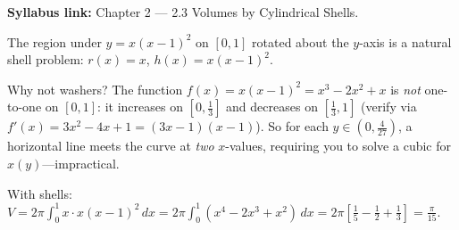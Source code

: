 \begin{extension}[title={Extension (Tutorial 4, Q5: Why shells are awkward for $y=x(x-1)^2$)}]
\textbf{Syllabus link:} Chapter 2 — 2.3 Volumes by Cylindrical Shells.

The region under $y=x(x-1)^2$ on $[0,1]$ rotated about the $y$-axis is a natural shell problem: $r(x)=x$, $h(x)=x(x-1)^2$.

Why not washers? The function $f(x)=x(x-1)^2=x^3-2x^2+x$ is \emph{not} one-to-one on $[0,1]$: it increases on $[0,\frac{1}{3}]$ and decreases on $[\frac{1}{3},1]$ (verify via $f'(x)=3x^2-4x+1=(3x-1)(x-1)$). So for each $y\in(0,\frac{4}{27})$, a horizontal line meets the curve at \emph{two} $x$-values, requiring you to solve a cubic for $x(y)$---impractical.

With shells:
$V=2\pi\int_0^1 x\cdot x(x-1)^2\,dx = 2\pi\int_0^1 (x^4-2x^3+x^2)\,dx = 2\pi\left[\frac{1}{5}-\frac{1}{2}+\frac{1}{3}\right]=\frac{\pi}{15}.$
\end{extension}

%
%
%
%
